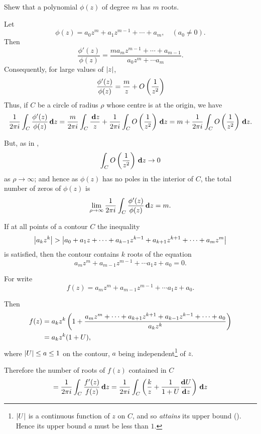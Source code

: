 %
%
\begin{wandwexample}
Shew that a polynomial $\phi(z)$ of degree $m$ has $m$ roots.

Let
$$
\phi(z)
=
a_{0} z^{m} + a_{1} z^{m-1} + \cdots + a_{m},
\quad
(a_{0} \neq 0).
$$
Then
$$
\frac{ \phi'(z) }{ \phi(z) }
=
\frac{ m a_{m}z^{m-1} + \cdots + a_{m-1} }{ a_{0}z^{m} + \cdots a_{m}}.
$$
Consequently, for large values of $\left| z \right|$,
$$
\frac{ \phi'(z) }{ \phi(z) }
=
\frac{m}{z} + O\left(  \frac{1}{z^{2}}  \right)
$$
Thus, if $C$ be a circle of radius $\rho$ whose centre is at the origin, we
have
$$
\frac{1}{2 \pi i} \int_{C} \frac{\phi'(z)}{\phi(z)} \, \mathbf{d} z
=
\frac{m}{2 \pi i} \int_{C} \frac{ \, \mathbf{d} z }{z}
+
\frac{1}{2 \pi i} \int_{C} O\left(  \frac{1}{z^{2}}  \right) \, \mathbf{d} z
=
m + \frac{1}{2 \pi i} \int_{C} O\left(  \frac{1}{z^{2}}  \right) \, \mathbf{d} z.
$$

But, as in ,
$$
\int_{C} O\left(  \frac{1}{z^{2}}  \right) \, \mathbf{d} z
\rightarrow
0
$$
as $\rho\rightarrow\infty$; and hence as $\phi(z)$ has no poles in the
interior of $C$, the total number of zeros of $\phi(z)$ is
$$
\lim_{\rho\rightarrow\infty}
\frac{1}{2\pi i}
\int_{C} \frac{ \phi'(z) }{\phi(z)} \, \mathbf{d} z
=
m.
$$
\end{wandwexample}
If at all points of a contour $C$ the inequality
$$
\left|  a_{k} z^{k}  \right|
>
\left| 
  a_{0}
  + a_{1} z
  + \cdots
  + a_{k-1} z^{k-1}
  + a_{k+1} z^{k+1}
  + \cdots
  + a_{m} z^{m}
 \right|
$$
is satisfied, then the contour contains $k$ roots of the equation
$$
a_{m} z^{m} + a_{m-1} z^{m-1} + \cdots a_{1} z + a_{0} = 0.
$$

For write
$$
f(z)
=
a_{m} z^{m} + a_{m-1} z^{m-1} + \cdots a_{1} z + a_{0}.
$$

Then
\begin{align*}
  f(z)
  &=
  a_{k} z^{k}
  \left(  1 +
    \frac{ a_{m}z^{m}
      + \cdots
      + a_{k+1}z^{k+1}
      + a_{k-1}z^{k-1}
      + \cdots
      + a_{0}
    }{ a_{k} z^{k} }
   \right)
  \\
  &= a_{k} z^{k} (1 + U),
\end{align*}
where $\left| U \right| \leq a \leq 1$ on the contour, $a$ being
independent\footnote{$\left| U \right|$ is a continuous function of $z$ on
  $C$, and so \emph{attains} its upper bound
  (). Hence its upper bound $a$ must be
  less than $1$.} of $z$.

Therefore the number of roots of $f(z)$ contained in $C$
$$
= \frac{1}{2 \pi i} \int_{C} \frac{f'(z)}{f(z)} \, \mathbf{d} z
= \frac{1}{2 \pi i}
\int_{C} \left(  \frac{k}{z}
  + \frac{1}{1+U} \frac{ \mathbf{d} U }{ \mathbf{d} z }
 \right) \, \mathbf{d} z
$$

